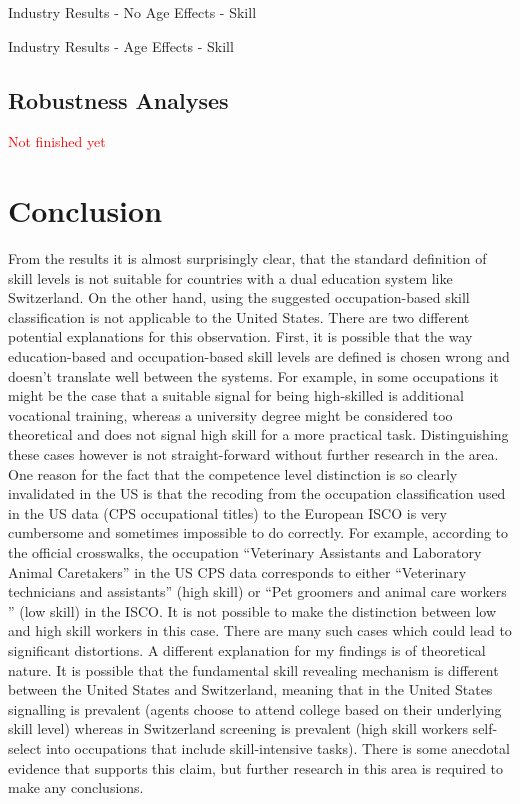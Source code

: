 \documentclass[]{article}
\begin{document}
\begin{table}[H]
  \centering
  \caption{Industry Results - No Age Effects - Skill}
  
  \label{indresults_noage}
\end{table}%


\begin{table}[H]
  \centering
  \caption{Industry Results - Age Effects - Skill}
  
  \label{indresults_age}
\end{table}%

\subsection{Robustness Analyses}
\label{robustness}
\textcolor{red}{Not finished yet}

\section{Conclusion}
From the results it is almost surprisingly clear, that the standard
definition of skill levels is not suitable for countries with a dual
education system like Switzerland. On the other hand, using the
suggested occupation-based skill classification is not applicable to
the United States. There are two different potential explanations for
this observation. First, it is possible that the way education-based
and occupation-based skill levels are defined is chosen wrong and
doesn't translate well between the systems. For example, in some
occupations it might be the case that a suitable signal for being
high-skilled is additional vocational training, whereas a university
degree might be considered too theoretical and does not signal high
skill for a more practical task. Distinguishing these cases however is
not straight-forward without further research in the area. One reason
for the fact that the competence level distinction is so clearly
invalidated in the US is that the recoding from the occupation
classification used in the US data (CPS occupational titles) to the
European ISCO is very cumbersome and sometimes impossible to do
correctly. For example, according to the official crosswalks, the
occupation ``Veterinary Assistants and Laboratory Animal Caretakers''
in the US CPS data corresponds to either ``Veterinary technicians and
assistants'' (high skill) or ``Pet groomers and animal care workers ''
(low skill) in the ISCO. It is not possible to make the distinction
between low and high skill workers in this case. There are many such
cases which could lead to significant distortions. A different
explanation for my findings is of theoretical nature. It is possible
that the fundamental skill revealing mechanism is different between
the United States and Switzerland, meaning that in the United States
signalling is prevalent (agents choose to attend college based on
their underlying skill level) whereas in Switzerland screening is
prevalent (high skill workers self-select into occupations that
include skill-intensive tasks). There is some anecdotal evidence that
supports this claim, but further research in this area is required to
make any conclusions.
\end{document}
